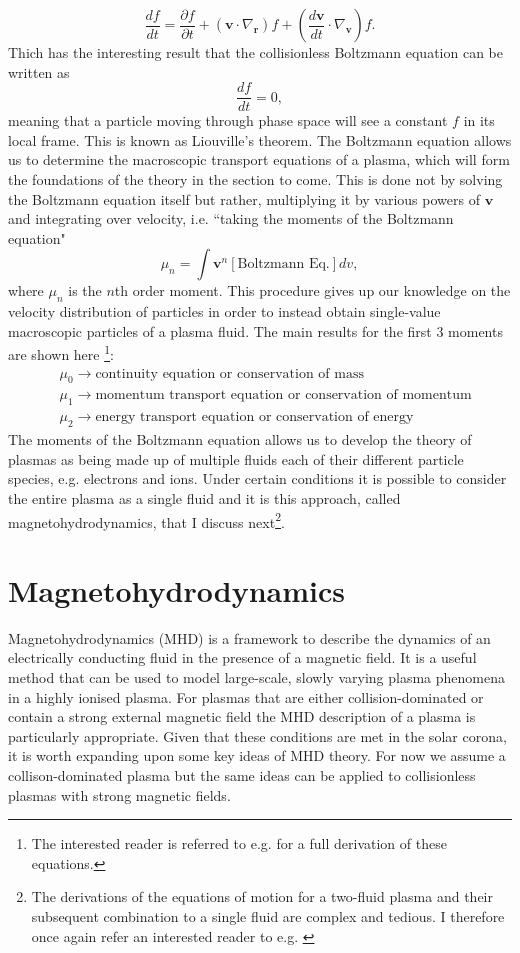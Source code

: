 \begin{equation}
\label{eq:KT_Vlasov_convective}
\frac{df}{dt} = \frac{\partial f}{\partial t} + (\mathbf{v} \cdot \nabla_\mathbf{r})f + \left(\frac{d\mathbf{v}}{dt} \cdot \nabla_\mathbf{v}\right)f.
\end{equation}
Thich has the interesting result that the collisionless Boltzmann equation can be written as
\begin{equation}
\label{eq:KT_Liouville}
\frac{df}{dt}=0,
\end{equation}
meaning that a particle moving through phase space will see a constant $f$ in its local frame. This is known as Liouville's theorem. The Boltzmann equation allows us to determine the macroscopic transport equations of a plasma, which will form the foundations of the theory in the section to come. This is done not by solving the Boltzmann equation itself but rather, multiplying it by various powers of $\mathbf{v}$ and integrating over velocity, i.e. ``taking the moments of the Boltzmann equation"
$$
\mu_n = \int \mathbf{v}^n\left[\mbox{Boltzmann Eq.}\right]dv,
$$
where $\mu_n$ is the $n$th order moment. This procedure gives up our knowledge on the velocity distribution of particles in order to instead obtain single-value macroscopic particles of a plasma fluid. The main results for the first 3 moments are shown here \footnote{The interested reader is referred to e.g. \cite{Inan2010} for a full derivation of these equations.}:
\begin{align*}
& \mu_0 \rightarrow  \mbox{continuity equation or conservation of mass} \\
& \mu_1 \rightarrow  \mbox{momentum transport equation or conservation of momentum} \\
& \mu_2 \rightarrow  \mbox{energy transport equation or conservation of energy}
\end{align*}
The moments of the Boltzmann equation allows us to develop the theory of plasmas as being made up of multiple fluids each of their different particle species, e.g. electrons and ions. Under certain conditions it is possible to consider the entire plasma as a single fluid and it is this approach, called magnetohydrodynamics, that I discuss next\footnote{The derivations of the equations of motion for a two-fluid plasma and their subsequent combination to a single fluid are complex and tedious. I therefore once again refer an interested reader to e.g. \cite{Inan2010}}.
\section{Magnetohydrodynamics}
\label{sec:MHD}
Magnetohydrodynamics (MHD) is a framework to describe the dynamics of an electrically conducting fluid in the presence of a magnetic field. It is a useful method that can be used to model large-scale, slowly varying plasma phenomena in a highly ionised plasma. For plasmas that are either collision-dominated or contain a strong external magnetic field the MHD description of a plasma is particularly appropriate. Given that these conditions are met in the solar corona, it is worth expanding upon some key ideas of MHD theory. For now we assume a collison-dominated plasma but the same ideas can be applied to collisionless plasmas with strong magnetic fields.


